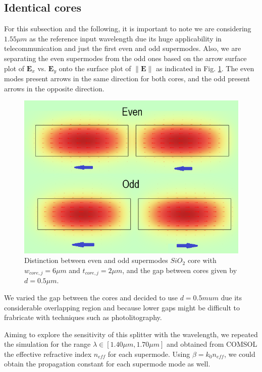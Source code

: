 \documentclass[conference, a4paper]{IEEEtran}
\begin{document}
\subsection{Identical cores}
\label{subsec:splitter_identical}

For this subsection and the following, it is important to note we are considering $1.55\mu m$ as the reference input wavelength due its huge applicability in telecommunication and just the first even and odd supermodes. Also, we are separating the even supermodes from the odd ones based on the arrow surface plot of $\mathbf{E}_x$ vs. $\mathbf{E}_y$ onto the surface plot of $\| \mathbf{E} \|$ as indicated in Fig. \ref{fig:splitter_identical_parity}. The even modes present arrows in the same direction for both cores, and the odd present arrows in the opposite direction.

\begin{figure}[H]
    \centering
    \includegraphics[scale=0.4]{even_odd_supermodes.png}
    \caption{Distinction between even and odd supermodes $SiO_2$ core with $w_{core, j} = 6\mu m$ and $t_{core, j} = 2\mu m$, and the gap between cores given by $d = 0.5\mu m$.}
    \label{fig:splitter_identical_parity}
\end{figure} 

We varied the gap between the cores and decided to use $d = 0.5mu m$ due its considerable overlapping region and because lower gaps might be difficult to frabricate with techniques such as photolitography.


Aiming to explore the sensitivity of this splitter with the wavelength, we repeated the simulation for the range $\lambda \in [1.40 \mu m, 1.70 \mu m]$ and obtained from COMSOL the effective refractive index $n_{eff}$ for each supermode. Using $\beta = k_0 n_{eff}$, we could obtain the propagation constant for each supermode mode as well.
\end{document}
